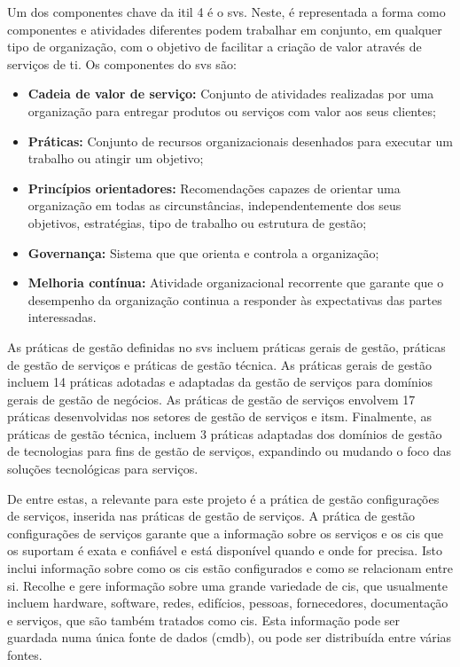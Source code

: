 \documentclass[
  oneside,
  11pt, a4paper,
  footinclude=true,
  headinclude=true,
  cleardoublepage=empty
]{scrbook}
\begin{document}
Um dos componentes chave da \gls{itil} 4 é o \gls{svs}. Neste, é representada a forma como componentes e atividades diferentes podem trabalhar em conjunto, em qualquer tipo de organização, com o objetivo de facilitar a criação de valor através de serviços de \gls{ti}. Os componentes do \gls{svs} são:
\begin{itemize}
    \item \textbf{Cadeia de valor de serviço:} Conjunto de atividades realizadas por uma organização para entregar produtos ou serviços com valor aos seus clientes;
    
    \item \textbf{Práticas:} Conjunto de recursos organizacionais desenhados para executar um trabalho ou atingir um objetivo;
    
    \item \textbf{Princípios orientadores:} Recomendações capazes de orientar uma organização em todas as circunstâncias, independentemente dos seus objetivos, estratégias, tipo de trabalho ou estrutura de gestão;
    
    \item \textbf{Governança:} Sistema que que orienta e controla a organização;
    
    \item \textbf{Melhoria contínua:} Atividade organizacional recorrente que garante que o desempenho da organização continua a responder às expectativas das partes interessadas.
\end{itemize}

As práticas de gestão definidas no \gls{svs} incluem práticas gerais de gestão, práticas de gestão de serviços e práticas de gestão técnica. As práticas gerais de gestão incluem 14 práticas adotadas e adaptadas da gestão de serviços para domínios gerais de gestão de negócios. As práticas de gestão de serviços envolvem 17 práticas desenvolvidas nos setores de gestão de serviços e \gls{itsm}. Finalmente, as práticas de gestão técnica, incluem 3 práticas adaptadas dos domínios de gestão de tecnologias para fins de gestão de serviços, expandindo ou mudando o foco das soluções tecnológicas para serviços.

De entre estas, a relevante para este projeto é a prática de gestão configurações de serviços, inserida nas práticas de gestão de serviços. A prática de gestão configurações de serviços garante que a informação sobre os serviços e os \glspl{ci} que os suportam é exata e confiável e está disponível quando e onde for precisa. Isto inclui informação sobre como os \glspl{ci} estão configurados e como se relacionam entre si. Recolhe e gere informação sobre uma grande variedade de \glspl{ci}, que usualmente incluem hardware, software, redes, edifícios, pessoas, fornecedores, documentação e serviços, que são também tratados como \glspl{ci}. Esta informação pode ser guardada numa única fonte de dados (\gls{cmdb}), ou pode ser distribuída entre várias fontes.
\end{document}
